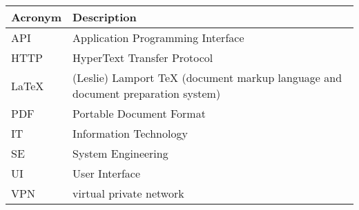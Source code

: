 \addtocounter{table}{-1}
\begin{longtable}{p{}p{}}\hline
\textbf{Acronym} & \textbf{Description}  \\\hline

API & Application Programming Interface \\\hline
HTTP & HyperText Transfer Protocol \\\hline
LaTeX & (Leslie) Lamport TeX (document markup language and document preparation system) \\\hline
PDF & Portable Document Format \\\hline
IT & Information Technology \\\hline
SE & System Engineering \\\hline
UI & User Interface \\\hline
VPN & virtual private network \\\hline
\end{longtable}
